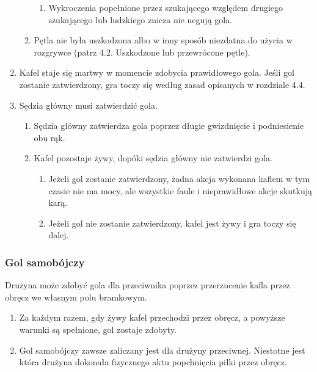 \documentclass[12pt]{article}
\begin{document}
\begin{enumerate}
\begin{enumerate}
		            \begin{enumerate}
			            \item
			                  Wykroczenia popełnione przez szukającego względem drugiego
			                  szukającego lub ludzkiego znicza nie negują gola.
		            \end{enumerate}
		      \item
		            Pętla nie była uszkodzona albo w inny sposób niezdatna do użycia w
		            rozgrywce (patrz 4.2. Uszkodzone lub przewrócone pętle).
	      \end{enumerate}
	\item
	      Kafel staje się martwy w momencie zdobycia prawidłowego gola. Jeśli
	      gol zostanie zatwierdzony, gra toczy się według zasad opisanych w
	      rozdziale 4.4.
	\item
	      Sędzia główny musi zatwierdzić gola.

	      \begin{enumerate}
		      \item
		            Sędzia główny zatwierdza gola poprzez długie gwizdnięcie i
		            podniesienie obu rąk.
		      \item
		            Kafel pozostaje żywy, dopóki sędzia główny nie zatwierdzi gola.

		            \begin{enumerate}
			            \item
			                  Jeżeli gol zostanie zatwierdzony, żadna akcja wykonana kaflem w
			                  tym czasie nie ma mocy, ale wszystkie faule i nieprawidłowe akcje
			                  skutkują karą.
			            \item
			                  Jeżeli gol nie zostanie zatwierdzony, kafel jest żywy i gra toczy
			                  się dalej.
		            \end{enumerate}
	      \end{enumerate}
\end{enumerate}

\subsubsection{Gol samobójczy}
Drużyna może zdobyć gola dla
przeciwnika poprzez przerzucenie kafla przez obręcz we własnym polu
bramkowym.

\begin{enumerate}
	\item
	      Za każdym razem, gdy żywy kafel przechodzi przez obręcz, a powyższe
	      warunki są spełnione, gol zostaje zdobyty.
	\item
	      Gol samobójczy zawsze zaliczany jest dla drużyny przeciwnej. Niestotne
	      jest która drużyna dokonała fizycznego aktu popchnięcia piłki przez
	      obręcz.
\end{enumerate}
\end{document}
